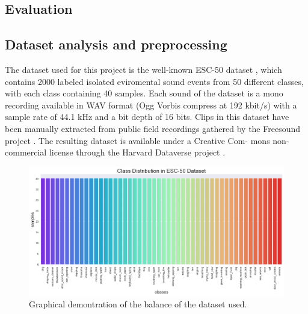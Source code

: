 \documentclass{article}
\begin{document}
\begin{sloppy}
\section{Evaluation}
\label{sec:evaluation}

\subsection{Dataset analysis and preprocessing}
\label{sec:format}

The dataset used for this project is the well-known ESC-50 dataset \cite{piczak2015dataset}, which contains
2000 labeled isolated eviromental sound events from 50 different classes, with each class containing 40 samples.
Each sound of the dataset is a mono recording available in WAV format (Ogg Vorbis
compress at 192 kbit/s) with a sample rate of 44.1 kHz and a bit depth of 16 bits.
Clips in this dataset have been manually extracted from public field recordings gathered
by the Freesound project \cite{fonseca2020fsd50k}. The resulting dataset is available under a Creative Com-
mons non-commercial license through the Harvard Dataverse project \cite{piczak2015dataset}.

\begin{figure}[ht]
  \centering
  \centerline{\includegraphics[width=\columnwidth]{balanced_dataset.png}}
  \caption{Graphical demontration of the balance of the dataset used.}
  \label{fig:balanced_dataset}
\end{figure}


\end{sloppy}
\end{document}
